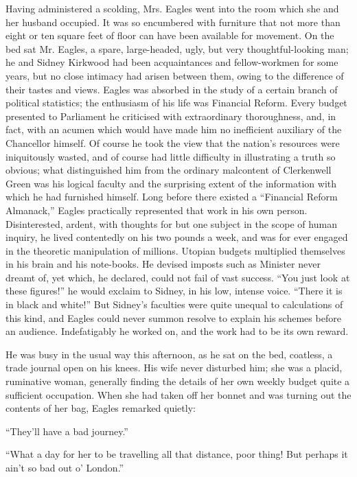 Having administered a scolding, Mrs. Eagles went into the room which she
and her husband occupied. It was so encumbered with furniture that not
more than eight or ten square feet of floor can have been available for
movement. On the bed sat Mr. Eagles, a spare, large-headed, ugly, but
very thoughtful-looking man; he and Sidney Kirkwood had been
acquaintances and fellow-workmen for some years, but no close intimacy
had arisen between them, owing to the difference of their tastes and
views. Eagles was absorbed in the study of a certain branch of political
statistics; the enthusiasm of his life was Financial Reform. Every
budget presented to Parliament he criticised with extraordinary
thoroughness, and, in fact, with an acumen which would have made him no
inefficient auxiliary of the Chancellor himself. Of course he took the
view that the nation's resources were iniquitously wasted, and of course
had little difficulty in illustrating a truth so {}obvious; what
distinguished him from the ordinary malcontent of Clerkenwell Green was
his logical faculty and the surprising extent of the information with
which he had furnished himself. Long before there existed a ``Financial
Reform Almanack,'' Eagles practically represented that work in his own
person. Disinterested, ardent, with thoughts for but one subject in the
scope of human inquiry, he lived contentedly on his two pounds a week,
and was for ever engaged in the theoretic manipulation of millions.
Utopian budgets multiplied themselves in his brain and his note-books.
He devised imposts such as Minister never dreamt of, yet which, he
declared, could not fail of vast success. ``You just look at these
figures!'' he would exclaim to Sidney, in his low, intense voice.
``There it is in black and white!'' But Sidney's faculties were quite
unequal to calculations of this kind, and Eagles could never summon
resolve to explain his schemes before an audience. Indefatigably he
worked on, and the work had to be its own reward.

{}He was busy in the usual way this afternoon, as he sat on the bed,
coatless, a trade journal open on his knees. His wife never disturbed
him; she was a placid, ruminative woman, generally finding the details
of her own weekly budget quite a sufficient occupation. When she had
taken off her bonnet and was turning out the contents of her bag, Eagles
remarked quietly:

``They'll have a bad journey.''

``What a day for her to be travelling all that distance, poor thing! But
perhaps it ain't so bad out o' London.''


